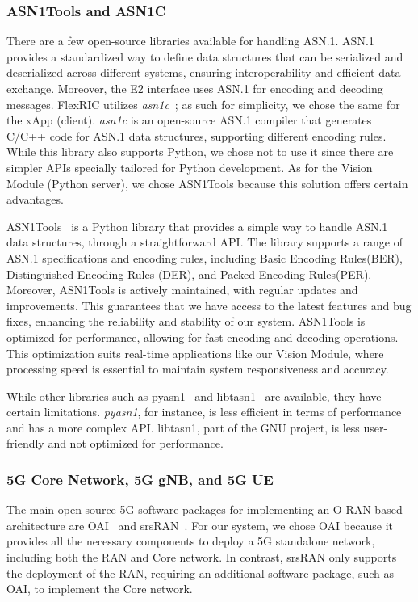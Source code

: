\subsubsection{ASN1Tools and ASN1C}
There are a few open-source libraries available for handling ASN.1.
ASN.1 provides a standardized way to define data structures that can be serialized and deserialized across different systems, ensuring interoperability and efficient data exchange.
Moreover, the E2 interface uses ASN.1 for encoding and decoding messages.
FlexRIC utilizes \emph{asn1c}~\cite{asn1c}; as such for simplicity, we chose the same for the xApp (client).
\emph{asn1c} is an open-source ASN.1 compiler that generates C/C++ code for ASN.1 data structures, supporting different encoding rules.
While this library also supports Python, we chose not to use it since there are simpler APIs specially tailored for Python development.
As for the Vision Module (Python server), we chose ASN1Tools because this solution offers certain advantages.

ASN1Tools~\cite{asn1tools} is a Python library that provides a simple way to handle ASN.1 data structures, through a straightforward API\@.
The library supports a range of ASN.1 specifications and encoding rules, including Basic Encoding Rules(BER), Distinguished Encoding Rules (DER), and Packed Encoding Rules(PER)\@.
Moreover, ASN1Tools is actively maintained, with regular updates and improvements.
This guarantees that we have access to the latest features and bug fixes, enhancing the reliability and stability of our system.
ASN1Tools is optimized for performance, allowing for fast encoding and decoding operations.
This optimization suits real-time applications like our Vision Module, where processing speed is essential to maintain system responsiveness and accuracy.

While other libraries such as pyasn1~\cite{pyasn1} and libtasn1~\cite{libtasn1} are available, they have certain limitations.
\emph{pyasn1}, for instance, is less efficient in terms of performance and has a more complex API\@.
libtasn1, part of the GNU project, is less user-friendly and not optimized for performance.


\subsubsection{5G Core Network, 5G gNB, and 5G UE}
The main open-source 5G software packages for implementing an O-RAN based architecture are OAI~\cite{openairinterface} and srsRAN~\cite{srslte}.
For our system, we chose OAI because it provides all the necessary components to deploy a 5G standalone network, including both the RAN and Core network.
In contrast, srsRAN only supports the deployment of the RAN, requiring an additional software package, such as OAI, to implement the Core network.


